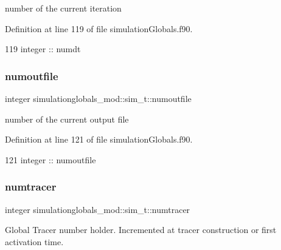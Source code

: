 number of the current iteration 



Definition at line 119 of file simulation\+Globals.\+f90.


\begin{DoxyCode}
119         \textcolor{keywordtype}{integer} :: numdt
\end{DoxyCode}
\mbox{\label{structsimulationglobals__mod_1_1sim__t_a5ae529652641c13a5471697d84b5db77}} 
\subsubsection{\texorpdfstring{numoutfile}{numoutfile}}
{\footnotesize\ttfamily integer simulationglobals\+\_\+mod\+::sim\+\_\+t\+::numoutfile\hspace{0.3cm}{\ttfamily [private]}}



number of the current output file 



Definition at line 121 of file simulation\+Globals.\+f90.


\begin{DoxyCode}
121         \textcolor{keywordtype}{integer} :: numoutfile
\end{DoxyCode}
\mbox{\label{structsimulationglobals__mod_1_1sim__t_a23cc2df1e0cf56990759076ed07b69f1}} 
\subsubsection{\texorpdfstring{numtracer}{numtracer}}
{\footnotesize\ttfamily integer simulationglobals\+\_\+mod\+::sim\+\_\+t\+::numtracer\hspace{0.3cm}{\ttfamily [private]}}



Global Tracer number holder. Incremented at tracer construction or first activation time. 



